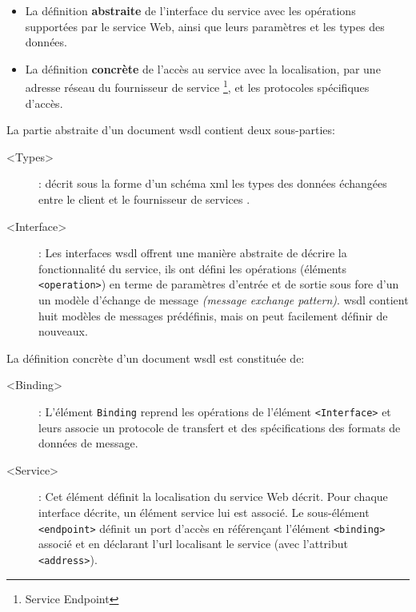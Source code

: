   

  \SpecialItem
  \begin{itemize}
  \item La définition \textbf{abstraite} de l'interface du service
    avec les opérations supportées par le service Web, ainsi que leurs
    paramètres et les types des données.

  \item La définition \textbf{concrète} de l'accès au service avec la
    localisation, par une adresse réseau du fournisseur de service
    \footnote{Service Endpoint}, et les protocoles spécifiques
    d'accès.
  \end{itemize}
  \enddescription

  La partie abstraite d'un document \acrshort{wsdl} contient deux
  sous-parties:

  \SpecialItem
  \renewcommand{\descriptionlabel}[1]{\hspace{0.5cm}\texttt{#1}}
  \begin{description}
  \item[<Types>]: décrit sous la forme d'un schéma \acrshort{xml} les
    types des données échangées entre le client et le fournisseur de
    services \cite{part20012}.

  \item[<Interface>]: Les interfaces \acrshort{wsdl} offrent une
    manière abstraite de décrire la fonctionnalité du service, ils ont
    défini les opérations (éléments \texttt{<operation>}) en terme de
    paramètres d'entrée et de sortie sous fore d'un un modèle
    d'échange de message \textit{(message exchange
      pattern)}. \acrshort{wsdl} contient huit modèles de messages
    prédéfinis, mais on peut facilement définir de nouveaux.
  \end{description}
  \enddescription

  La définition concrète d'un document \acrshort{wsdl} est constituée
  de:

  \SpecialItem
  \renewcommand{\descriptionlabel}[1]{\hspace{0.5cm}\texttt{#1}}
  \begin{description}
  \item[<Binding>]: L'élément \texttt{Binding} reprend les opérations
    de l'élément \texttt{<Interface>} et leurs associe un protocole de
    transfert et des spécifications des formats de données de message.

  \item[<Service>]: Cet élément définit la localisation du service Web
    décrit. Pour chaque interface décrite, un élément service lui est
    associé. Le sous-élément \texttt{<endpoint>} définit un port
    d’accès en référençant l'élément \texttt{<binding>} associé et en
    déclarant l'\acrshort{url} localisant le service (avec l'attribut
    \texttt{<address>}).
  \end{description}


